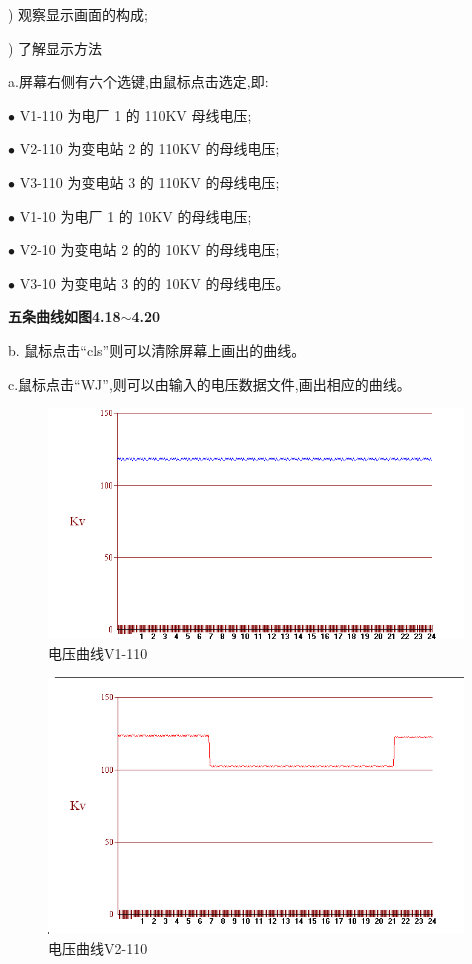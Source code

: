 \documentclass[a4paper]{ctexrep}
\begin{document}
                    ) 观察显示画面的构成;

                    ) 了解显示方法

                    \qquad a.屏幕右侧有六个选键,由鼠标点击选定,即:

                    \qquad \quad $\bullet$ \quad V1-110 为电厂 1 的 110KV 母线电压;

                    \qquad \quad $\bullet$ \quad V2-110 为变电站 2 的 110KV 的母线电压;

                    \qquad \quad $\bullet$ \quad V3-110 为变电站 3 的 110KV 的母线电压;

                    \qquad \quad $\bullet$ \quad V1-10 为电厂 1 的 10KV 的母线电压;

                    \qquad \quad $\bullet$ \quad V2-10 为变电站 2 的的 10KV 的母线电压;

                    \qquad \quad $\bullet$ \quad V3-10 为变电站 3 的的 10KV 的母线电压。

                    \qquad \textbf{五条曲线如图4.18$\sim$4.20}

                    \qquad b. 鼠标点击“cls”则可以清除屏幕上画出的曲线。

                    \qquad c.鼠标点击“WJ”,则可以由输入的电压数据文件,画出相应的曲线。

                    \begin{figure}[htbp]
                        \centering
                        \includegraphics[width=11cm]{31.png} 
                        \caption{电压曲线V1-110}
                    \end{figure}

                    \begin{figure}[htbp]
                        \centering
                        \includegraphics[width=11cm]{32.png} 
                        \caption{电压曲线V2-110}
                    \end{figure}
\end{document}
